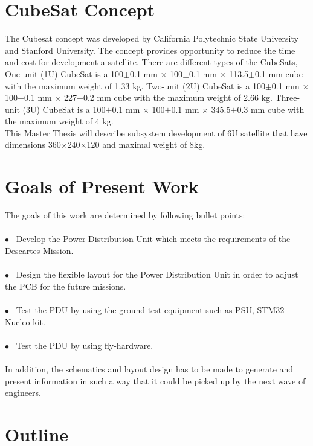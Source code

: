 \section{CubeSat Concept}
The Cubesat concept was developed by California Polytechnic State University and Stanford University. The concept provides opportunity to reduce the time and cost for development a satellite. There are different types of the CubeSats, One-unit (1U) CubeSat is a 100$\pm$0.1 mm $\times$ 100$\pm$0.1 mm $\times$ 113.5$\pm$0.1 mm cube with the maximum weight of 1.33 kg. Two-unit (2U) CubeSat is a 100$\pm$0.1 mm $\times$ 100$\pm$0.1 mm $\times$ 227$\pm$0.2 mm cube with the maximum weight of 2.66 kg. Three-unit (3U) CubeSat is a 100$\pm$0.1 mm $\times$ 100$\pm$0.1 mm $\times$ 345.5$\pm$0.3 mm cube with the maximum weight of 4 kg.\\

 This Master Thesis will describe subsystem development of 6U satellite that have dimensions 360$\times$240$\times$120 and maximal weight of 8kg.\\ 

\section{Goals of Present Work\label{Goals}}
The goals of this work are determined by following bullet points:\\ \\
$\bullet$ \ Develop the Power Distribution Unit which meets the requirements of the Descartes Mission.\\ \\
$\bullet$ \ Design the flexible layout for the Power Distribution Unit in order to adjust the PCB for the future missions.\\ \\
$\bullet$ \ Test the PDU by using the ground test equipment such as PSU, STM32 Nucleo-kit.\\ \\
$\bullet$ \ Test the PDU by using fly-hardware.\\ \\

In addition, the schematics and layout design has to be made to generate and present information in such a way that it could be picked up by the next wave of engineers.



\section{Outline\label{sec:outline}}

